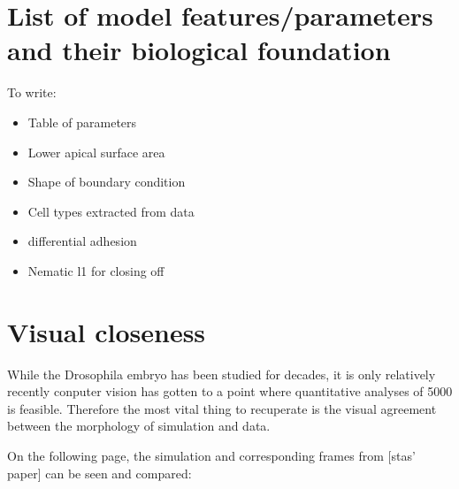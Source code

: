\section{List of model features/parameters and their biological foundation}

To write:
\begin{itemize}
    \item Table of parameters
    \item Lower apical surface area
    \item Shape of boundary condition
    \item Cell types extracted from data
    \item differential adhesion
    \item Nematic l1 for closing off
\end{itemize}
\section{Visual closeness}
While the Drosophila embryo has been studied for decades, it is only relatively recently conputer vision has gotten to a point where quantitative analyses of 5000 is feasible. Therefore the most vital thing to recuperate is the visual agreement between the morphology of simulation and data.

On the following page, the simulation and corresponding frames from [stas' paper] can be seen and compared:

\newpage

